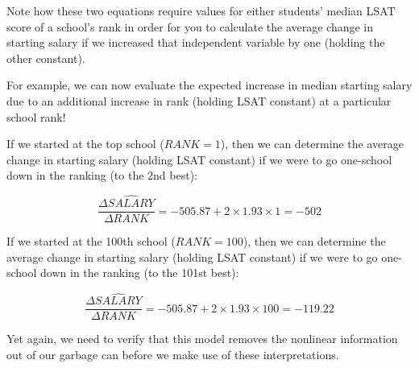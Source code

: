 \documentclass[
]{book}
\begin{document}
Note how these two equations require values for either students' median LSAT score of a school's rank in order for you to calculate the average change in starting salary if we increased that independent variable by one (holding the other constant).

For example, we can now evaluate the expected increase in median starting salary due to an additional increase in rank (holding LSAT constant) at a particular school rank!

If we started at the top school (\(RANK = 1\)), then we can determine the average change in starting salary (holding LSAT constant) if we were to go one-school down in the ranking (to the 2nd best):

\[\frac{\Delta \widehat{SALARY}}{\Delta RANK} = -505.87 + 2 \times 1.93 \times 1 = -502\]

If we started at the 100th school (\(RANK = 100\)), then we can determine the average change in starting salary (holding LSAT constant) if we were to go one-school down in the ranking (to the 101st best):

\[\frac{\Delta \widehat{SALARY}}{\Delta RANK} = -505.87 + 2 \times 1.93 \times 100 = -119.22\]

Yet again, we need to verify that this model removes the nonlinear information out of our garbage can before we make use of these interpretations.
\end{document}
